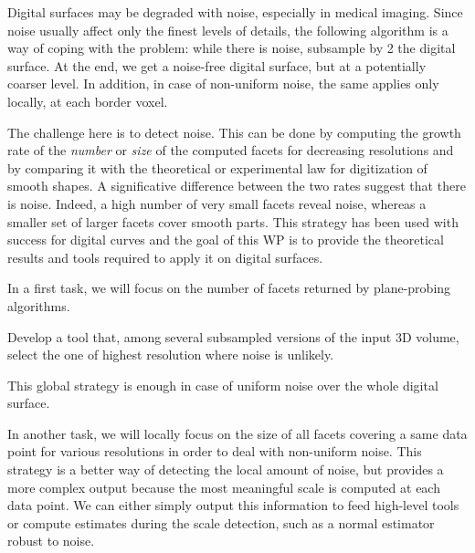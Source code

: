 Digital surfaces may be degraded with noise, especially in medical imaging.
Since noise usually affect only the finest levels of details, the following algorithm
is a way of coping with the problem: while there is noise, subsample by 2 the digital surface.
At the end, we get a noise-free digital surface, but at a potentially coarser level.
In addition, in case of non-uniform noise, the same applies only locally, \ie at each border voxel.  

The challenge here is to detect noise. This can be done by computing the growth rate of the
\emph{number} or \emph{size} of the computed facets for decreasing resolutions
and by comparing it with the theoretical or experimental law for digitization of smooth shapes.
A significative difference between the two rates suggest that there is noise.
Indeed, a high number of very small facets reveal noise, whereas
a smaller set of larger facets cover smooth parts.     
This strategy has been used with success for digital curves \cite{Kerautret2012}
and the goal of this WP is to provide the theoretical results and tools required to apply it on digital surfaces. 


In a first task, we will focus on the number of facets returned by plane-probing algorithms.

\begin{Task}
  \label{task:global}
  Develop a tool that, among several subsampled versions of the input 3D volume,
  select the one of highest resolution where noise is unlikely.
\end{Task}

This global strategy is enough in case of uniform noise over the whole digital surface.  

In another task, we will locally focus on the size of all facets covering a same data point
for various resolutions in order to deal with non-uniform noise. 
This strategy is a better way of detecting the local amount of noise,
but provides a more complex output because the most meaningful scale is
computed at each data point.
We can either simply output this information to feed high-level tools
or compute estimates during the scale detection, such as a normal estimator
robust to noise.  


